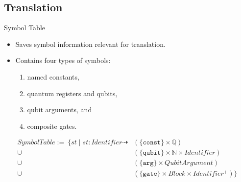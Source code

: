 \subsection{Translation}
\begin{frame}{Symbol Table}
    \begin{itemize}
        \item Saves symbol information relevant for translation.
        \item Contains four types of symbols:
        \begin{enumerate}
            \item named constants,
            \item quantum registers and qubits,
            \item qubit arguments, and
            \item composite gates. 
        \end{enumerate} 
    \end{itemize}
    \begin{align*}
        SymbolTable := \ \{st \mid st : Identifier \dashrightarrow & (\{\texttt{const}\} \times \mathbb{Q})\\
        \cup& (\{\texttt{qubit}\} \times \mathbb{N} \times Identifier)\\
        \cup& (\{\texttt{arg}\} \times QubitArgument)\\
        \cup& (\{\texttt{gate}\} \times Block \times Identifier^+)
        \}
    \end{align*}
\end{frame}

